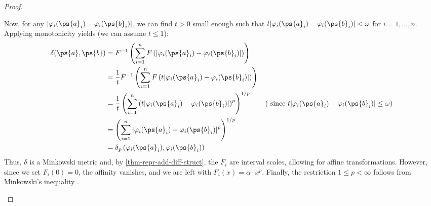\begin{proof}
	\begin{proofpart}
		Now, for any $|\varphi_i(\ps{a}_i) - \varphi_i(\ps{b}_i)|$, we can find $t > 0$ small enough such that $t|\varphi_i(\ps{a}_i) - \varphi_i(\ps{b}_i)| < \omega$ for $i = 1, \ldots, n$. Applying monotonicity yields (we can assume $t \leq 1$):
		\begin{align*}
			\delta(\ps{a}, \ps{b}) & = F^{-1} \left( \sum_{i=1}^{n} F \left( |\varphi_i(\ps{a}_i) - \varphi_i(\ps{b}_i)| \right) \right)                                                                                      \\
			                       & = \frac{1}{t} F^{-1} \left( \sum_{i=1}^{n} F \left( t |\varphi_i(\ps{a}_i) - \varphi_i(\ps{b}_i)| \right) \right)                                                                        \\
			                       & = \frac{1}{t} \left( \sum_{i=1}^{n} \left( t|\varphi_i(\ps{a}_i) - \varphi_i(\ps{b}_i)| \right)^p \right)^{1/p} \tag{ since $t |\varphi_i(\ps{a}_i) - \varphi_i(\ps{b}_i)| \leq \omega$} \\
			                       & = \left( \sum_{i=1}^{n} |\varphi_i(\ps{a}_i) - \varphi_i(\ps{b}_i)|^p \right)^{1/p}                                                                                                      \\
			                       & = \metr[p]{\varphi_i(\ps{a}_i)}{\varphi_i(\ps{b}_i)}
		\end{align*}
		Thus, $\delta$ is a Minkowski metric and, by \cref{thm-repr-add-diff-struct}, the $F_i$ are interval scales, allowing for affine transformations. However, since we set $F_i(0)=0$, the affinity vanishes, and we are left with $F_i(x)= \alpha \cdot x^p$. Finally, the restriction $1 \leq p < \infty$ follows from Minkowski's inequality \parencite[pp. 189-191 Theorem 9]{handbookMeans}.
	\end{proofpart}
\end{proof}

